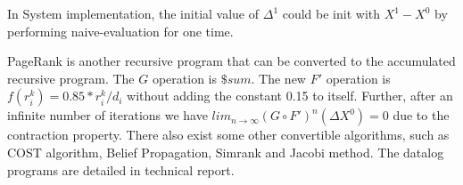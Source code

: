 In System implementation, the initial value of $\Delta^1$ could be init with $X^1-X^0$ by performing naive-evaluation for one time. 

PageRank is another recursive program that can be converted to the accumulated recursive program. The $G$ operation is $\$sum$. The new $F'$ operation is $f(r_i^k)=0.85*r_i^k/d_i$ without adding the constant 0.15 to itself. Further, after an infinite number of iterations we have $lim_{n\rightarrow\infty}(G\circ F')^n(\Delta X^0)=0$ due to the contraction property. There also exist some other convertible algorithms, such as COST algorithm, Belief Propagation, Simrank and Jacobi method. The datalog programs are detailed in technical report\cite{fullversion}. 

